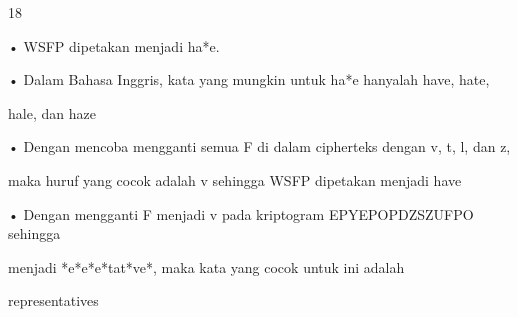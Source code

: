 \documentclass{article}
\begin{document}

18

• WSFP dipetakan menjadi ha*e. 

• Dalam Bahasa Inggris, kata yang mungkin untuk ha*e hanyalah have, hate, 

hale, dan haze 

• Dengan mencoba mengganti semua F di dalam cipherteks dengan v, t, l, dan z, 

maka huruf yang cocok adalah v sehingga WSFP dipetakan menjadi have

• Dengan mengganti F menjadi v pada  kriptogram EPYEPOPDZSZUFPO sehingga 

menjadi *e*e*e*tat*ve*, maka kata yang cocok untuk ini adalah 

representatives
\end{document}
